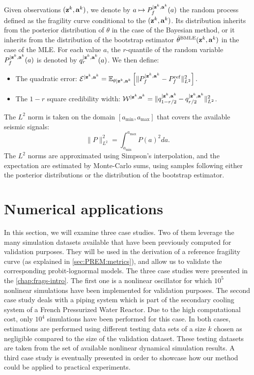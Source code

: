 Given observations $(\mathbf{z}^k,\mathbf{a}^k)$, we denote by $a\mapsto P_f^{|\mathbf{z}^k,\mathbf{a}^k}(a)$ the random process defined as the fragility curve conditional to the $(\mathbf{z}^k,\mathbf{a}^k)$. Its distribution inherits from the posterior distribution of $\theta$ in the case of the Bayesian method, or it inherits from the distribution of the bootstrap estimator $\hat\theta^{\text{BMLE}}(\mathbf{z}^k,\mathbf{a}^k)$ in the case of the MLE.
For each value $a$, the $r$-quantile of the random variable $P_f^{|\mathbf{z}^k,\mathbf{a}^k}(a)$ is denoted by $q_r^{|\mathbf{z}^k,\mathbf{a}^k}(a)$. We then define:
\begin{itemize}
    \item The quadratic error: $\mathcal{E}^{|\mathbf{z}^k,\mathbf{a}^k}=\mathbb{E}_{\theta|\mathbf{z}^k,\mathbf{a}^k}\left[\|P_f^{|\mathbf{z}^k,\mathbf{a}^k}-P_f^{\mathrm{ref}} \|^2_{L^2}\right].$
        \item The $1-r$ square credibility width: $\mathcal{W}^{|\mathbf{z}^k,\mathbf{a}^k}= \|q_{1-{r/2}}^{|\mathbf{z}^k,\mathbf{a}^k} - q_{{r/2}}^{|\mathbf{z}^k,\mathbf{a}^k}\|_{L^2}^2$.
\end{itemize}
The $L^2$ norm is taken on the domain $[a_{\text{min}},a_{\text{max}}]$ that covers  the available seismic signals: 
\begin{equation}
    \|P\|^2_{L^2} = \int_{a_{\text{min}}}^{a_{\text{max}}} P(a)^2da.    
\end{equation}
The $L^2$ norms are approximated using Simpson's interpolation, and the expectation are estimated by Monte-Carlo sums, using samples following either the posterior distributions or the distribution of the bootstrap estimator. 









\section{Numerical applications}\label{sec:PREM:numapp}


In this section, we will examine three case studies.
Two of them leverage the many simulation datasets available that have been previously computed for validation purposes. They will be used in the derivation of a reference fragility curve (as explained in \cref{sec:PREM:metrics}), and allow us to validate the corresponding probit-lognormal models. 
The three case studies were presented in the \cref{chap:frags-intro}. The first one is a nonlinear oscillator
for which $10^5$ nonlinear simulations have been implemented for validation purposes. The second case study deals with a piping system which is part of the secondary cooling system of a French Pressurized Water Reactor. Due to the high computational cost, only $10^4$ simulations have been performed for this case. In both cases, estimations are performed using different testing data sets of a size $k$ chosen as negligible compared to the size of the validation dataset. These testing datasets are taken from the set of available nonlinear dynamical simulation results. {A third case study is eventually presented %
in order to showcase how our method could be applied to practical experiments.}





